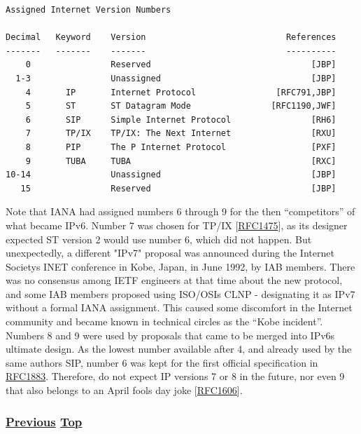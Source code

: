 \documentclass[
]{article}
\begin{document}
\begin{verbatim}
Assigned Internet Version Numbers

Decimal   Keyword    Version                            References
-------   -------    -------                            ----------
    0                Reserved                                [JBP]
  1-3                Unassigned                              [JBP]
    4       IP       Internet Protocol                [RFC791,JBP]
    5       ST       ST Datagram Mode                [RFC1190,JWF]
    6       SIP      Simple Internet Protocol                [RH6]
    7       TP/IX    TP/IX: The Next Internet                [RXU]
    8       PIP      The P Internet Protocol                 [PXF]
    9       TUBA     TUBA                                    [RXC]
10-14                Unassigned                              [JBP]
   15                Reserved                                [JBP]
\end{verbatim}

Note that IANA had assigned numbers 6 through 9 for the then
``competitors'' of what became IPv6. Number 7 was chosen for TP/IX
{[}\href{https://www.rfc-editor.org/info/rfc1475}{RFC1475}{]}, as its
designer expected ST version 2 would use number 6, which did not happen.
But unexpectedly, a different "IPv7" proposal was announced during the
Internet Society\textquotesingle s INET conference in Kobe, Japan, in
June 1992, by IAB members. There was no consensus among IETF engineers
at that time about the new protocol, and some IAB members proposed using
ISO/OSI\textquotesingle s CLNP - designating it as IPv7 without a formal
IANA assignment. This caused some discomfort in the Internet community
and became known in technical circles as the ``Kobe incident''. Numbers
8 and 9 were used by proposals that came to be merged into
IPv6\textquotesingle s ultimate design. As the lowest number available
after 4, and already used by the same author\textquotesingle s SIP,
number 6 was kept for the first official specification in
\href{https://www.rfc-editor.org/info/rfc1883}{RFC1883}. Therefore, do
not expect IP versions 7 or 8 in the future, nor even 9 that also
belongs to an April fool\textquotesingle s day joke
{[}\href{https://www.rfc-editor.org/info/rfc1606}{RFC1606}{]}.

\subsubsection{\texorpdfstring{\hyperref[acknowledgments]{Previous}
\hyperref[introduction-and-foreword]{Top}}{Previous Top}}\label{previous-top}
\end{document}
